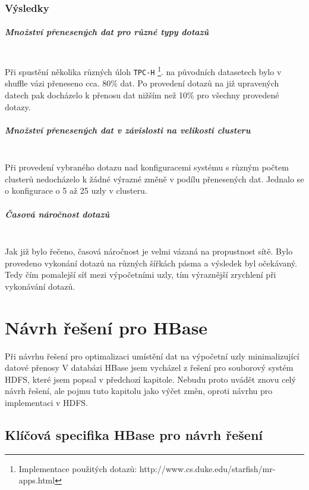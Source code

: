 \documentclass[thesis=M,czech]{FITthesis}[2012/06/26]
\begin{document}
\subsection{Výsledky}

\paragraph{Množství přenesených dat pro různé typy dotazů} \hfill \\
 Při spustění několika různých úloh \texttt{TPC-H} \footnote{Implementace použitých dotazů: http://www.cs.duke.edu/starfish/mr-apps.html}.  na původních datasetech bylo v shuffle vázi přeneseno cca. 80\% dat. Po provedení dotazů na již upravených datech pak docházelo k přenosu dat  nižším než 10\% pro všechny provedené dotazy.

\paragraph{Množství přenesených dat v závislosti na velikosti clusteru} \hfill \\
Při provedení vybraného dotazu nad konfiguracemi systému s různým počtem clusterů nedocházelo k žádné výrazné změně v podílu přenesených dat. Jednalo se o konfigurace o 5 až 25 uzly v clusteru.

\paragraph{Časová náročnost dotazů} \hfill \\
Jak již bylo řečeno, časová náročnost je velmi vázaná na propustnost sítě. Bylo provedeno vykonání dotazů na různých šířkách pásma a výsledek byl očekávaný. Tedy čím pomalejší síť mezi výpočetními uzly, tím výraznější zrychlení při vykonávání dotazů.






\chapter{Návrh řešení pro HBase}
Při návrhu řešení pro optimalizaci umístění dat na výpočetní uzly minimalizující datové přenosy V databázi HBase jsem vycházel z řešení pro souborový systém HDFS, které jsem popsal v předchozí kapitole. Nebudu proto uvádět znovu celý návrh řešení, ale pojmu tuto kapitolu jako výčet změn, oproti návrhu pro implementaci v HDFS. 
\section{Klíčová specifika HBase pro návrh řešení}
\end{document}
